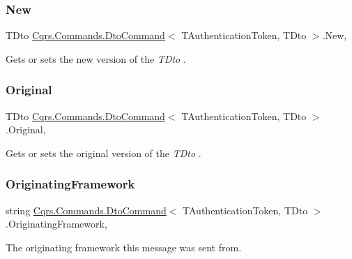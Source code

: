 \subsubsection{\texorpdfstring{New}{New}}
{\footnotesize\ttfamily T\+Dto \hyperlink{classCqrs_1_1Commands_1_1DtoCommand}{Cqrs.\+Commands.\+Dto\+Command}$<$ T\+Authentication\+Token, T\+Dto $>$.New\hspace{0.3cm}{\ttfamily [get]}, {\ttfamily [set]}}



Gets or sets the new version of the {\itshape T\+Dto} . 

\mbox{\label{classCqrs_1_1Commands_1_1DtoCommand_a67471c7e64228ee832343be7b89aa708_a67471c7e64228ee832343be7b89aa708}} 
\subsubsection{\texorpdfstring{Original}{Original}}
{\footnotesize\ttfamily T\+Dto \hyperlink{classCqrs_1_1Commands_1_1DtoCommand}{Cqrs.\+Commands.\+Dto\+Command}$<$ T\+Authentication\+Token, T\+Dto $>$.Original\hspace{0.3cm}{\ttfamily [get]}, {\ttfamily [set]}}



Gets or sets the original version of the {\itshape T\+Dto} . 

\mbox{\label{classCqrs_1_1Commands_1_1DtoCommand_a7272fbc4acb35942a1c5fb22cd3a6b9b_a7272fbc4acb35942a1c5fb22cd3a6b9b}} 
\subsubsection{\texorpdfstring{Originating\+Framework}{OriginatingFramework}}
{\footnotesize\ttfamily string \hyperlink{classCqrs_1_1Commands_1_1DtoCommand}{Cqrs.\+Commands.\+Dto\+Command}$<$ T\+Authentication\+Token, T\+Dto $>$.Originating\+Framework\hspace{0.3cm}{\ttfamily [get]}, {\ttfamily [set]}}



The originating framework this message was sent from. 

